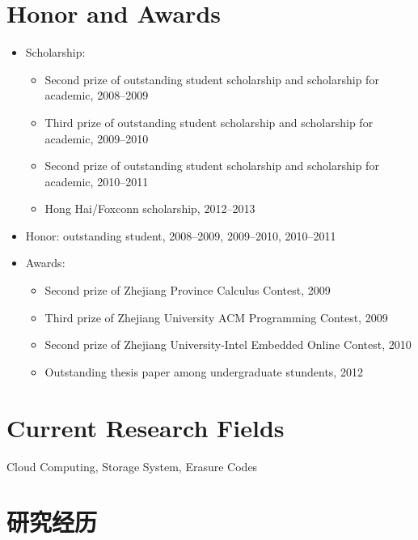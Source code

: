 \documentclass[letterpaper]{article}
\begin{document}
\section*{Honor and Awards}
\begin{itemize}
\item Scholarship:
    \begin{itemize}
    \item Second prize of outstanding student scholarship and scholarship for academic, 2008--2009
    \item Third prize of outstanding student scholarship and scholarship for academic, 2009--2010
    \item Second prize of outstanding student scholarship and scholarship for academic, 2010--2011
	\item Hong Hai/Foxconn scholarship, 2012--2013				
    \end{itemize}
\item Honor: outstanding student, 2008--2009, 2009--2010, 2010--2011
\item Awards:
    \begin{itemize}
    \item Second prize of Zhejiang Province Calculus Contest, 2009
    \item Third prize of Zhejiang University ACM Programming Contest, 2009
    \item Second prize of Zhejiang University-Intel Embedded Online Contest, 2010
    \item Outstanding thesis paper among undergraduate stundents, 2012
    \end{itemize}
\end{itemize}

\section*{Current Research Fields}
Cloud Computing, Storage System, Erasure Codes

\section*{研究经历}
\end{document}
